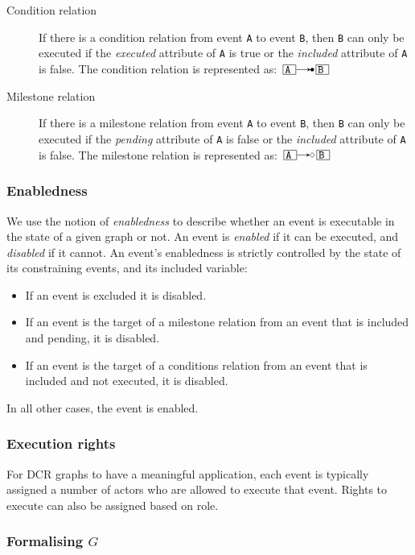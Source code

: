 \documentclass{article}
\begin{document}
\begin{description}
\begin{description}
					\item[Condition relation] If there is a condition relation from event \texttt{A} to event \texttt{B}, then \texttt{B} can only be executed if the \textit{executed} attribute of \texttt{A} is true or the \textit{included} attribute of \texttt{A} is false.
				The condition relation is represented as: $\ev{A} \crel \ev{B}$
					\item[Milestone relation] If there is a milestone relation from event \texttt{A} to event \texttt{B}, then \texttt{B} can only be executed if the \textit{pending} attribute of \texttt{A} is false or the \textit{included} attribute of \texttt{A} is false.
				The milestone relation is represented as: $\ev{A} \mrel \ev{B}$
				\end{description}
			\end{description}

			\subsubsection*{Enabledness}

			We use the notion of \textit{enabledness} to describe whether an event is executable in the state of a given graph or not.
			An event is \textit{enabled} if it can be executed, and \textit{disabled} if it cannot.
			An event's enabledness is strictly controlled by the state of its constraining events, and its included variable:
			\begin{itemize}
				\item If an event is excluded it is disabled.
				\item If an event is the target of a milestone relation from an event that is included and pending, it is disabled.
				\item If an event is the target of a conditions relation from an event that is included and not executed, it is disabled.
			\end{itemize}
			In all other cases, the event is enabled.

			\subsubsection*{Execution rights}

			For DCR graphs to have a meaningful application, each event is typically assigned a number of actors who are allowed to execute that event.
			Rights to execute can also be assigned based on role.

			\subsubsection*{Formalising \texorpdfstring{$G$}{}}
\end{document}
